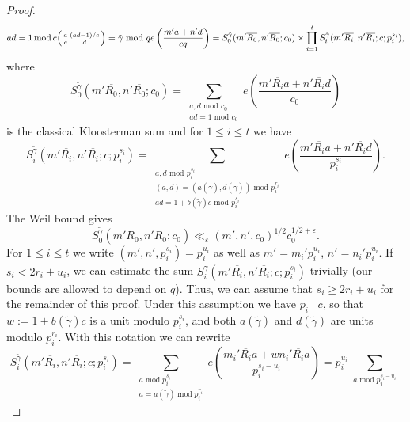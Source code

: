 \documentclass[10pt,a4paper]{amsart}
\DeclareMathOperator{\modulo}{mod}
\begin{document}
\begin{proof}
\begin{equation*}
{{    ad = 1 \modulo c\\
    \begin{psmallmatrix}
        a & (ad-1)/c\\
        c & d
    \end{psmallmatrix} = \tilde{\gamma} \text{ mod }q}} e\left(\frac{m'a + n'd}{cq}\right) = S^{\tilde{\gamma}}_0(m'\overline{R_0}, n' \overline{R_0}; c_0) \times \prod_{i = 1}^t S^{\tilde{\gamma}}_i(m'\overline{R_i}, n' \overline{R_i}; c; p_i^{s_i}),
\end{equation*}
where 
\begin{equation*}
S^{\tilde{\gamma}}_0(m'\overline{R_0}, n' \overline{R_0}; c_0) = \sum_{\substack{a, d \text{ mod }c_0\\
ad = 1 \text{ mod }c_0}} e\left(\frac{m'\overline{R_i}a + n'\overline{R_i}d}{c_0}\right)
\end{equation*} 
is the classical Kloosterman sum and for $1\leq i \leq t$ we have
\begin{equation*}
S^{\tilde{\gamma}}_i(m'\overline{R_i}, n' \overline{R_i}; c; p_i^{s_i}) = \sum_{\substack{a, d \text{ mod }p_i^{s_i}\\
(a, d) = (a(\tilde{\gamma}), d(\tilde{\gamma})) \text{ mod }p_i^{r_i}\\
ad = 1 + b(\tilde{\gamma})c \text{ mod }p_i^{s_i}}} e\left(\frac{m' \overline{R_i}a + n' \overline{R_i}d}{p_i^{s_i}}\right).
\end{equation*}
The Weil bound gives
\begin{equation*}
S^{\tilde{\gamma}}_0(m'\overline{R_0}, n' \overline{R_0}; c_0)     \ll_\varepsilon (m', n', c_0)^{1/2}c_0^{1/2 + \varepsilon}.
\end{equation*}
For $1 \leq i \leq t$ we write $(m', n', p_i^{s_i}) = p_i^{u_i}$ as well as $m' = m_i' p_i^{u_i}$, $n' = n_i' p_i^{u_i}$. If $s_i < 2r_i + u_i$, we can estimate the sum $S^{\tilde{\gamma}}_i(m'\overline{R_i}, n' \overline{R_i}; c; p_i^{s_i})$ trivially (our bounds are allowed to depend on $q$). Thus, we can assume that $s_i \geq 2r_i + u_i$ for the remainder of this proof. Under this assumption we have $p_i \mid c$, so that $w := 1 + b(\widetilde{\gamma})c$ is a unit modulo $p_i^{s_i}$, and both $a(\widetilde{\gamma})$ and $d(\widetilde{\gamma})$ are units modulo $p_i^{r_i}$. With this notation we can rewrite 
\begin{equation*}
    S^{\tilde{\gamma}}_i(m'\overline{R_i}, n' \overline{R_i}; c; p_i^{s_i}) = \sum_{\substack{a \modulo p_i^{s_i}\\
    a = a(\widetilde{\gamma}) \modulo p_i^{r_i}}} e\left(\frac{m_i' \overline{R_i} a + wn_i' \overline{R_i} \overline{a}}{p_i^{s_i - u_i}}\right) = p_i^{u_i} \sum_{\substack{a \modulo p_i^{s_i - u_i}\\
}}
\end{equation*}
\end{proof}
\end{document}
